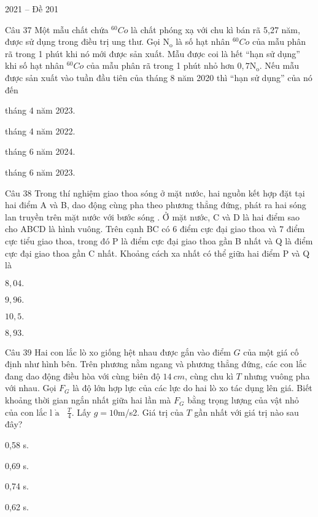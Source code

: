 \documentclass{book}
\begin{document}
\begin{quiz}{2021 – Đề 201}
\begin{multi}[points=1]{Câu 37}
 Một mẫu chất chứa  ${}^{60}Co$ là chất phóng xạ với chu kì bán rã 5,27 năm, được sử dụng trong điều trị ung thư. Gọi ${{\text{N}}_{\text{o}}}$ là số hạt nhân ${}^{60}Co$  của mẫu phân rã trong 1 phút khi nó mới được sản xuất. Mẫu được coi là hết “hạn sử dụng” khi số hạt nhân ${}^{60}Co$  của mẫu phân rã trong 1 phút nhỏ hơn $0,7{{\text{N}}_{\text{o}}}$. Nếu mẫu được sản xuất vào tuần đầu tiên của tháng 8 năm 2020 thì “hạn sử dụng” của nó đến

\item*  tháng 4 năm 2023.	
\item  tháng 4 năm 2022.	
\item  tháng 6 năm 2024.	
\item  tháng 6 năm 2023.
\end{multi}

\begin{multi}[points=1]{Câu 38}
 Trong thí nghiệm giao thoa sóng ở mặt nước, hai nguồn kết hợp đặt tại hai điểm A và B, dao động cùng pha theo phương thẳng đứng, phát ra hai sóng lan truyền trên mặt nước với bước sóng . Ở mặt nước, C và D là hai điểm sao cho ABCD là hình vuông. Trên cạnh BC có $6$ điểm cực đại giao thoa và $7$ điểm cực tiểu giao thoa, trong đó P là điểm cực đại giao thoa gần B nhất và Q là điểm cực đại giao thoa gần C nhất. Khoảng cách xa nhất có thể giữa hai điểm P và Q là

\item  $8,04.$	
\item  $9,96.$	
\item*  $10,5.$	
\item  $8,93.$
\end{multi}

\begin{multi}[points=1]{Câu 39}
 Hai con lắc lò xo giống hệt nhau được gắn vào điểm $G$ của một giá cố định như hình bên. Trên phương nằm ngang và phương thẳng đứng, các con lắc đang dao động điều hòa với cùng biên độ $14~cm$, cùng chu kì $T$ nhưng vuông pha với nhau. Gọi ${{F}_{G}}$ là độ lớn hợp lực của các lực do hai lò xo tác dụng lên giá. Biết khoảng thời gian ngắn nhất giữa hai lần mà ${{F}_{G}}$ bằng trọng lượng của vật nhỏ của con lắc $\text{l }\!\!\grave{\mathrm{a}}\!\!\text{ }~\frac{T}{4}$. Lấy $g=10$m/s2. Giá trị của $T$ gần nhất với giá trị nào sau đây? 

\item  0,58 s.	
\item  0,69 s.	
\item*  0,74 s.	
\item  0,62 s.
\end{multi}


\end{quiz}
\end{document}
